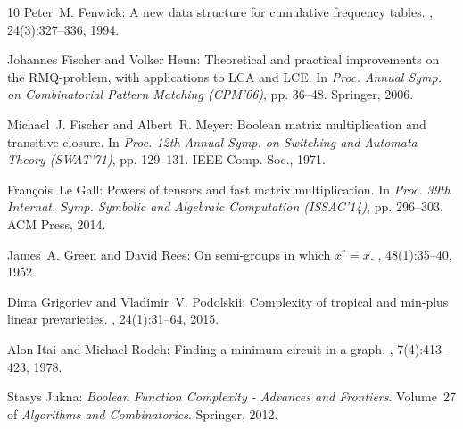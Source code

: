 \begin{thebibliography}{10}
{\sc Peter~M. Fenwick}: A new data structure for cumulative frequency tables.
, 24(3):327--336, 1994.

{\sc Johannes Fischer and Volker Heun}: Theoretical and practical improvements
  on the {RMQ}-problem, with applications to {LCA} and {LCE}.
\newblock In {\em Proc. Annual Symp. on Combinatorial Pattern Matching
  (CPM'06)}, pp. 36--48. Springer, 2006.
\newblock [\epfmtdoi{10.1007/11780441\_5}]

{\sc Michael~J. Fischer and Albert~R. Meyer}: Boolean matrix multiplication and
  transitive closure.
\newblock In {\em Proc. 12th Annual Symp. on Switching and Automata Theory
  (SWAT'71)}, pp. 129--131. IEEE Comp. Soc., 1971.

{\sc Fran{\c{c}}ois~Le Gall}: Powers of tensors and fast matrix multiplication.
\newblock In {\em Proc. 39th Internat. Symp. Symbolic and Algebraic Computation
  (ISSAC'14)}, pp. 296--303. ACM Press, 2014.
\newblock [\epfmtdoi{10.1145/2608628.2608664}]

{\sc James~A. Green and David Rees}: On semi-groups in which $x^r = x$.
, 48(1):35--40, 1952.
\newblock [\epfmtdoi{10.1017/S0305004100027341}]

{\sc Dima Grigoriev and Vladimir~V. Podolskii}: Complexity of tropical and
  min-plus linear prevarieties.
, 24(1):31--64, 2015.
\newblock [\epfmtdoi{10.1007/s00037-013-0077-5}]

{\sc Alon Itai and Michael Rodeh}: Finding a minimum circuit in a graph.
, 7(4):413--423, 1978.
\newblock [\epfmtdoi{10.1137/0207033}]

{\sc Stasys Jukna}: {\em Boolean Function Complexity - Advances and Frontiers}.
\newblock Volume~27 of {\em Algorithms and Combinatorics}.
\newblock Springer, 2012.
\newblock [\epfmtdoi{10.1007/978-3-642-24508-4}]


\end{thebibliography}
